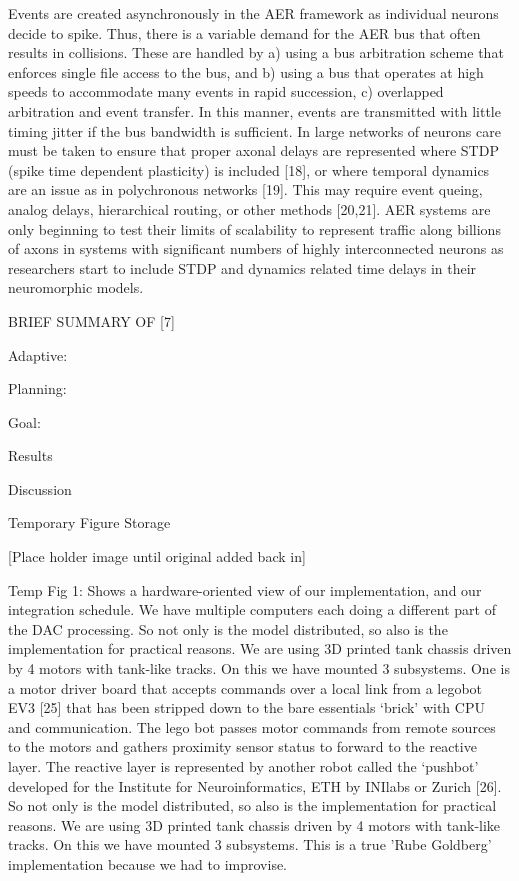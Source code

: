 Events are created asynchronously in the AER framework as individual
neurons decide to spike. Thus, there is a variable demand for the
AER bus that often results in collisions. These are handled by a)
using a bus arbitration scheme that enforces single file access to
the bus, and b) using a bus that operates at high speeds to accommodate
many events in rapid succession, c) overlapped arbitration and event
transfer. In this manner, events are transmitted with little timing
jitter if the bus bandwidth is sufficient. In large networks of neurons
care must be taken to ensure that proper axonal delays are represented
where STDP (spike time dependent plasticity) is included {[}18{]},
or where temporal dynamics are an issue as in polychronous networks
{[}19{]}. This may require event queing, analog delays, hierarchical
routing, or other methods {[}20,21{]}. AER systems are only beginning
to test their limits of scalability to represent traffic along billions
of axons in systems with significant numbers of highly interconnected
neurons as researchers start to include STDP and dynamics related
time delays in their neuromorphic models.

BRIEF SUMMARY OF {[}7{]}

Adaptive:

Planning:

Goal:

Results

Discussion

Temporary Figure Storage

{[}Place holder image until original added back in{]}

Temp Fig 1: Shows a hardware-oriented view of our implementation,
and our integration schedule. We have multiple computers each doing
a different part of the DAC processing. So not only is the model distributed,
so also is the implementation for practical reasons. We are using
3D printed tank chassis driven by 4 motors with tank-like tracks.
On this we have mounted 3 subsystems. One is a motor driver board
that accepts commands over a local link from a legobot EV3 {[}25{]}
that has been stripped down to the bare essentials \textquoteleft{}brick\textquoteright{}
with CPU and communication. The lego bot passes motor commands from
remote sources to the motors and gathers proximity sensor status to
forward to the reactive layer. The reactive layer is represented by
another robot called the \textquoteleft{}pushbot\textquoteright{}
developed for the Institute for Neuroinformatics, ETH by INIlabs or
Zurich {[}26{]}. So not only is the model distributed, so also is
the implementation for practical reasons. We are using 3D printed
tank chassis driven by 4 motors with tank-like tracks. On this we
have mounted 3 subsystems. This is a true 'Rube Goldberg' implementation
because we had to improvise.

